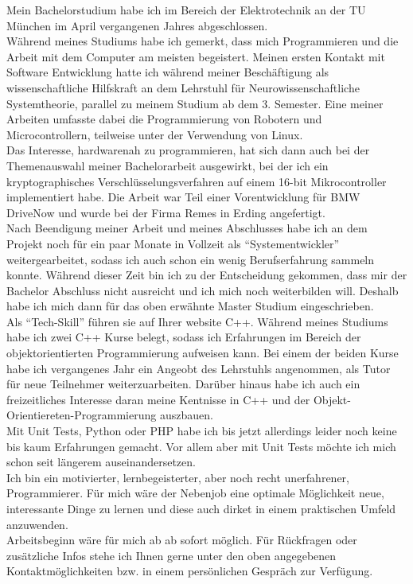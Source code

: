 \documentclass[12pt, a4paper]{awesome-cv}
\begin{document}
\begin{cvletter}
Mein Bachelorstudium habe ich im Bereich der Elektrotechnik an der TU München im April vergangenen Jahres abgeschlossen.
\\Während meines Studiums habe ich gemerkt, dass mich Programmieren und die Arbeit mit dem Computer am meisten begeistert. Meinen ersten Kontakt mit Software Entwicklung hatte ich während meiner Beschäftigung als wissenschaftliche Hilfskraft an dem Lehrstuhl für Neurowissenschaftliche Systemtheorie, parallel zu meinem Studium ab dem 3. Semester. Eine meiner Arbeiten umfasste dabei die Programmierung von Robotern und Microcontrollern, teilweise unter der Verwendung von Linux.
\\Das Interesse, hardwarenah zu programmieren, hat sich dann auch bei der Themenauswahl meiner Bachelorarbeit ausgewirkt, bei der ich ein kryptographisches Verschlüsselungsverfahren auf einem 16-bit Mikrocontroller implementiert habe. Die Arbeit war Teil einer Vorentwicklung für BMW DriveNow und wurde bei der Firma Remes in Erding angefertigt.
\\Nach Beendigung meiner Arbeit und meines Abschlusses habe ich an dem Projekt noch für ein paar Monate in Vollzeit als “Systementwickler” weitergearbeitet, sodass ich auch schon ein wenig Berufserfahrung sammeln konnte. Während dieser Zeit bin ich zu der Entscheidung gekommen, dass mir der Bachelor Abschluss nicht ausreicht und ich mich noch weiterbilden will. Deshalb habe ich mich dann für das oben erwähnte Master Studium eingeschrieben. 
\\Als “Tech-Skill” führen sie auf Ihrer website C++. Während meines Studiums habe ich zwei C++ Kurse belegt, sodass ich Erfahrungen im Bereich der objektorientierten Programmierung aufweisen kann. Bei einem der beiden Kurse habe ich vergangenes Jahr ein Angeobt des Lehrstuhls angenommen, als Tutor für neue Teilnehmer weiterzuarbeiten. Darüber hinaus habe ich auch ein freizeitliches Interesse daran meine Kentnisse in C++ und der Objekt-Orientiereten-Programmierung auszbauen.
\\Mit Unit Tests, Python oder PHP habe ich bis jetzt allerdings leider noch keine bis kaum Erfahrungen gemacht. Vor allem aber mit Unit Tests möchte ich mich schon seit längerem auseinandersetzen. 
\\Ich bin ein motivierter, lernbegeisterter, aber noch recht unerfahrener, Programmierer. Für mich wäre der Nebenjob eine optimale Möglichkeit neue, interessante Dinge zu lernen und diese auch dirket in einem praktischen Umfeld anzuwenden.
\\Arbeitsbeginn wäre für mich ab ab sofort möglich. Für Rückfragen oder zusätzliche Infos stehe ich Ihnen gerne unter den oben angegebenen Kontaktmöglichkeiten bzw. in einem persönlichen Gespräch zur Verfügung.
\end{cvletter}


\makeletterclosing
\end{document}
